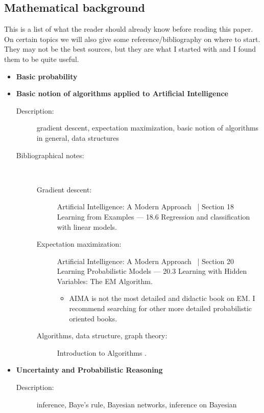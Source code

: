 \documentclass[a4paper,10pt]{article}
\theoremstyle{plain}
\begin{document}
\begin{appendices}

\section{Mathematical background}\label{app:bak}

This is a list of what the reader should already know before reading this paper. On certain topics
we will also give some reference/bibliography on where to start. They may not be the best sources,
but they are what I started with and I found them to be quite useful.

\begin{itemize}
  \item \textbf{Basic probability}
  \item \textbf{Basic notion of algorithms applied to Artificial Intelligence}
    \begin{description}
      \item[Description:] gradient descent, expectation maximization, basic notion of algorithms in
        general, data structures
      \item[Bibliographical notes:]\ \
        \begin{description}
          \item[Gradient descent:] Artificial Intelligence: A Modern Approach~\cite{aima} | Section
            18 Learning from Examples --- 18.6 Regression and classification with linear models.
          \item[Expectation maximization:] Artificial Intelligence: A Modern Approach~\cite{aima} |
            Section 20 Learning Probabilistic Models --- 20.3 Learning with Hidden Variables: The
            EM Algorithm.
            \begin{itemize}
              \item AIMA is not the most detailed and didactic book on EM\@. I recommend searching
                for other more detailed probabilistic oriented books.
            \end{itemize}
          \item[Algorithms, data structure, graph theory:] Introduction to Algorithms
            \cite{algorithms}.
        \end{description}
    \end{description}
  \item \textbf{Uncertainty and Probabilistic Reasoning}
    \begin{description}
      \item[Description:] inference, Baye's rule, Bayesian networks, inference on Bayesian

\end{description}
\end{itemize}
\end{appendices}
\end{document}
